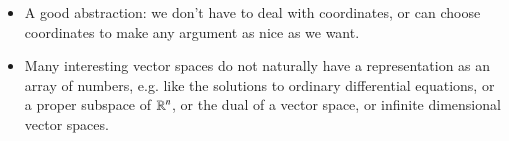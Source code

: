 \begin{itemize}
    \item A good abstraction: we don't have to deal with coordinates, or can choose coordinates to make any argument as nice as we want.

    \item Many interesting vector spaces do not naturally have a representation as an array of numbers, e.g. like the solutions to ordinary differential equations, or a proper subspace of $\operatorname{\mathbb{R}}^n$, or the dual of a vector space, or infinite dimensional vector spaces.
\end{itemize}





